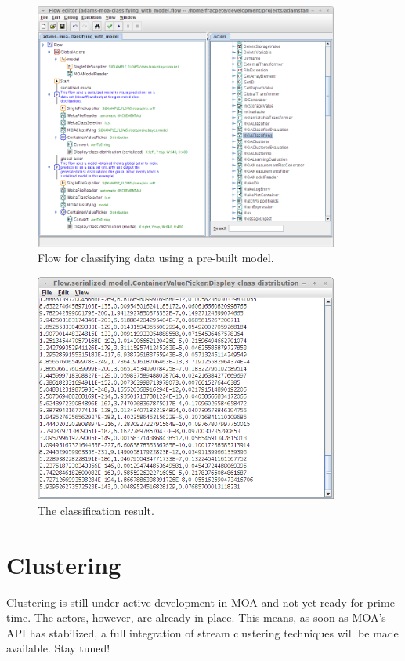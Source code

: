 \documentclass[a4paper]{book}
\begin{document}
\begin{figure}[htb]
  \centering
  \includegraphics[width=10.0cm]{images/moa-classifying-flow.png}
  \caption{Flow for classifying data using a pre-built model.}
  \label{moa-classifying-flow}
\end{figure}

\begin{figure}[htb]
  \centering
  \includegraphics[width=10.0cm]{images/moa-classifying-output.png}
  \caption{The classification result.}
  \label{moa-classifying-output}
\end{figure}

\clearpage
\newpage
\section{Clustering}
Clustering is still under active development in MOA and not yet ready 
for prime time. The actors, however, are already in place. This means,
as soon as MOA's API has stabilized, a full integration of stream 
clustering techniques will be made available. Stay tuned!
\end{document}
